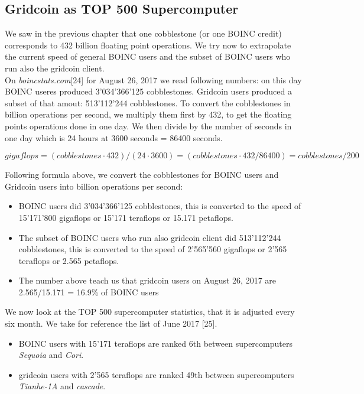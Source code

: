 \subsection{Gridcoin as TOP 500 Supercomputer}

We saw in the previous chapter that one cobblestone (or one BOINC credit) corresponds to 432 billion floating point operations. We try now to extrapolate the current speed of general BOINC users and the subset of BOINC users who run also the gridcoin client.\\

On \textit{boincstats.com}[24] for August 26, 2017 we read following numbers: on this day BOINC useres produced 3'034'366'125 cobblestones. Gridcoin users produced a subset of that amout: 513'112'244 cobblestones. To convert the cobblestones in billion operations per second, we multiply them first by 432, to get the floating points operations done in one day. We then divide by the number of seconds in one day which is 24 hours at 3600 seconds = 86400 seconds.

\[ gigaflops = (cobblestones \cdot 432)/(24 \cdot 3600) = (cobblestones \cdot 432/86400) = cobblestones/200 \]

Following formula above, we convert the cobblestones for BOINC users and Gridcoin users into billion operations per second:

\begin{itemize}
	\item BOINC users did 3'034'366'125 cobblestones, this is converted to the speed of 15'171'800 gigaflops or 15'171 teraflops or 15.171 petaflops.
	\item The subset of BOINC users who run also gridcoin client did 513'112'244 cobblestones, this is converted to the speed of 2'565'560 gigaflops or 2'565 teraflops or 2.565 petaflops.
	\item The number above teach us that gridcoin users on August 26, 2017 are 2.565/15.171 = 16.9\% of BOINC users
\end{itemize}

We now look at the TOP 500 supercomputer statistics, that it is adjusted every six month. We take for reference the list of June 2017 [25].

\begin{itemize}
    \item BOINC users with 15'171 teraflops are ranked 6th between supercomputers \textit{Sequoia} and \textit{Cori}.
	\item gridcoin users with 2'565 teraflops are ranked 49th between supercomputers \textit{Tianhe-1A} and \textit{cascade}.
\end{itemize}

